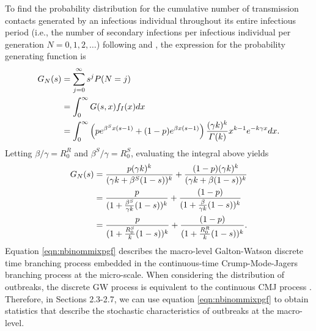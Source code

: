 \documentclass{imammb}
\numberwithin{equation}{section}
\begin{document}
To find the probability distribution for the cumulative number of transmission contacts generated by an infectious individual throughout its entire infectious period (i.e., the number of secondary infections per infectious individual per generation $N = 0, 1,2, \dots$) following \citet{Mode2000-hp} and \citet{Yan2008-jc}, the expression for the probability generating function is
\begin{align}\label{eqn:mixturepgf}
    G_N(s) &= \sum_{j=0}^{\infty} s^j P(N=j) \notag \\ &= \int_0^{\infty} G(s,x) f_I(x) dx \notag \\ &= \int_0^\infty \left (p e^{\beta^S x (s-1)}+(1-p)e^{\beta x (s-1)} \right) \frac{(\gamma k)^k}{\Gamma(k)} x^{k-1}e^{-k \gamma x} dx.
\end{align}
Letting $\beta /\gamma = R_0^R$ and $\beta^S /\gamma = R_0^S$, evaluating the integral above yields %
\begin{align}\label{eqn:nbinommixpgf}
    G_N(s) &=  \frac{p(\gamma k)^k}{(\gamma k + \beta^S(1-s))^k} +   \frac{(1-p)(\gamma k)^k}{(\gamma k + \beta(1-s))^k}\notag  \notag \\ &=  \frac{p}{(1 + \frac{\beta^S}{\gamma k}(1-s))^k} +   \frac{(1-p)}{(1 + \frac{\beta}{\gamma k}(1-s))^k} \notag \\&=  \frac{p}{(1 + \frac{R_0^S}{k}(1-s))^k} +   \frac{(1-p)}{(1 + \frac{R_0^R}{k}(1-s))^k}. 
\end{align}
Equation \eqref{eqn:nbinommixpgf} describes the macro-level Galton-Watson discrete time branching process embedded in the continuous-time Crump-Mode-Jagers branching process at the micro-scale. When considering the distribution of outbreaks, the discrete GW process is equivalent to the continuous CMJ process \citep{Mode2000-hp, Garske2008-ax, Yan2008-jc}. Therefore, in Sections 2.3-2.7, we can use equation \eqref{eqn:nbinommixpgf} to obtain statistics that describe the stochastic characteristics of outbreaks at the macro-level.
\end{document}
